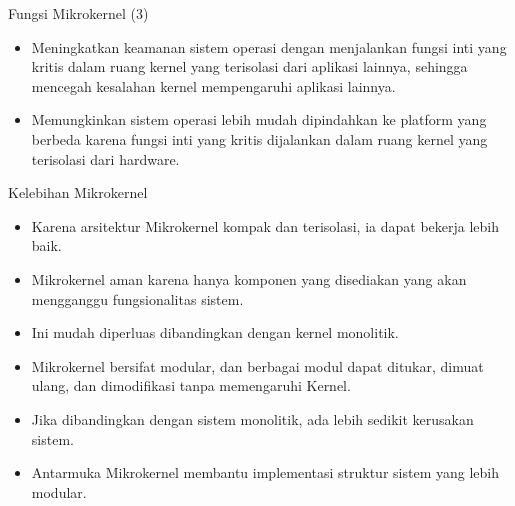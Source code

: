\documentclass[aspectratio=169, table]{beamer}
\begin{document}
	\begin{frame}{Fungsi Mikrokernel (3)}
		\begin{itemize}
				\item Meningkatkan keamanan sistem operasi dengan menjalankan fungsi inti yang kritis dalam ruang kernel yang terisolasi dari aplikasi lainnya, sehingga mencegah kesalahan kernel mempengaruhi aplikasi lainnya.

			\item Memungkinkan sistem operasi lebih mudah dipindahkan ke platform yang berbeda karena fungsi inti yang kritis dijalankan dalam ruang kernel yang terisolasi dari hardware.
		\end{itemize}
	\end{frame}



	\begin{frame}{Kelebihan Mikrokernel}
		\begin{itemize}

			\item Karena arsitektur Mikrokernel kompak dan terisolasi, ia dapat bekerja lebih baik.

			\item Mikrokernel aman karena hanya komponen yang disediakan yang akan mengganggu fungsionalitas sistem.

			\item Ini mudah diperluas dibandingkan dengan kernel monolitik.

			\item Mikrokernel bersifat modular, dan berbagai modul dapat ditukar, dimuat ulang, dan dimodifikasi tanpa memengaruhi Kernel.

			\item Jika dibandingkan dengan sistem monolitik, ada lebih sedikit kerusakan sistem.

			\item Antarmuka Mikrokernel membantu implementasi struktur sistem yang lebih modular.


		\end{itemize}
	\end{frame}
\end{document}
